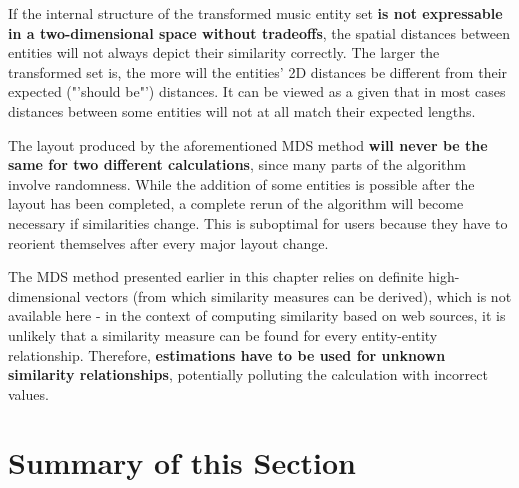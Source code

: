 If the internal structure of the transformed music entity set \textbf{is not expressable in a two-dimensional space without tradeoffs}, the spatial distances between entities will not always depict their similarity correctly. The larger the transformed set is, the more will the entities' 2D distances be different from their expected ("'should be"') distances. It can be viewed as a given that in most cases distances between some entities will not at all match their expected lengths.

The layout produced by the aforementioned MDS method \textbf{will never be the same for two different calculations}, since many parts of the algorithm involve randomness. While the addition of some entities is possible after the layout has been completed, a complete rerun of the algorithm will become necessary if similarities change. This is suboptimal for users because they have to reorient themselves after every major layout change.

The MDS method presented earlier in this chapter relies on definite high-dimensional vectors (from which similarity measures can be derived), which is not available here - in the context of computing similarity based on web sources, it is unlikely that a similarity measure can be found for every entity-entity relationship. Therefore, \textbf{estimations have to be used for unknown similarity relationships}, potentially polluting the calculation with incorrect values.

\section{Summary of this Section}